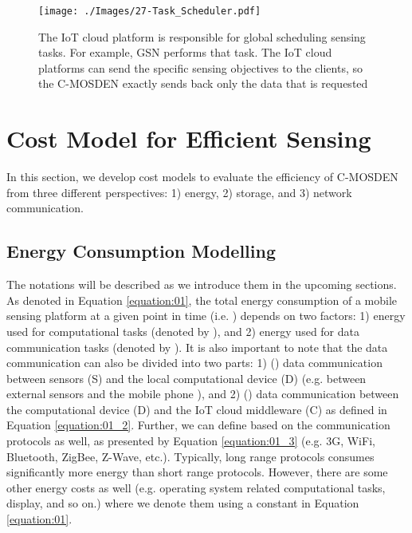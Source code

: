 \documentclass[journal]{IEEEtran}
\begin{document}
\begin{figure}[t]
 \centering
 \vspace{-0.43cm}
 \texttt{[image: ./Images/27-Task\_Scheduler.pdf]}
\caption{The IoT cloud platform is responsible for global scheduling sensing tasks. For example, GSN performs that task.  The IoT cloud platforms can send the specific sensing objectives to the clients, so the C-MOSDEN exactly sends back only the data that is requested}
 \label{Figure:Task_Scheduler}	
\end{figure}









\section{Cost Model for Efficient Sensing}
\label{sec:Model}

In this section, we develop cost models to evaluate the efficiency of C-MOSDEN from three different perspectives: 1) energy, 2) storage, and 3) network communication.








\subsection{Energy Consumption Modelling}
\label{sec:Energy}

 

The notations will be described  as we introduce them in the upcoming sections. As denoted in Equation \ref{equation:01}, the total energy consumption of a mobile sensing platform at a given point in time (i.e. ) depends on two factors: 1) energy used for computational tasks (denoted by ), and 2) energy used for data communication tasks (denoted by ). It is also important to note that the data communication can also be divided into two parts: 1) () data communication between sensors (S) and the local computational device (D)  (e.g.  between external sensors and the mobile phone \cite{ZMPB001}), and 2) () data communication between the computational device (D) and the IoT cloud  middleware (C) as defined in Equation \ref{equation:01_2}. Further, we can define  based on the communication protocols as well, as presented by Equation \ref{equation:01_3} (e.g. 3G, WiFi, Bluetooth, ZigBee, Z-Wave, etc.). Typically, long range protocols consumes significantly more energy than short range protocols. However, there are some other energy costs as well (e.g. operating system related computational tasks, display, and so on.) where we denote them using a constant  in Equation \ref{equation:01}.
\end{document}

